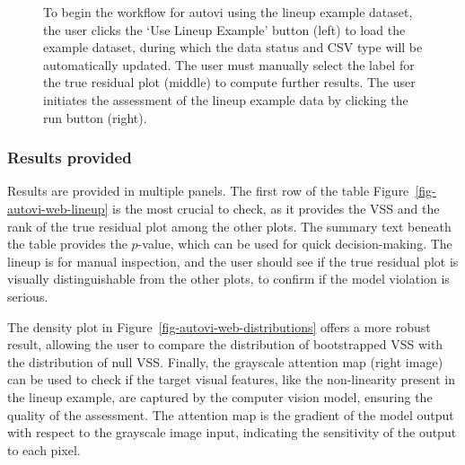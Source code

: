 \documentclass[
doublespace,
  times]{anzsauth}
\begin{document}
\begin{figure}


\caption{\label{fig-autovi-web-setup}To begin the workflow for
\textsf{autovi} using the lineup example dataset, the user clicks the
`Use Lineup Example' button (left) to load the example dataset, during
which the data status and CSV type will be automatically updated. The
user must manually select the label for the true residual plot (middle)
to compute further results. The user initiates the assessment of the
lineup example data by clicking the run button (right).}

\end{figure}%

\subsubsection{Results provided}\label{results-provided}

Results are provided in multiple panels. The first row of the table
Figure~\ref{fig-autovi-web-lineup} is the most crucial to check, as it
provides the VSS and the rank of the true residual plot among the other
plots. The summary text beneath the table provides the \(p\)-value,
which can be used for quick decision-making. The lineup is for manual
inspection, and the user should see if the true residual plot is
visually distinguishable from the other plots, to confirm if the model
violation is serious.

The density plot in Figure~\ref{fig-autovi-web-distributions} offers a
more robust result, allowing the user to compare the distribution of
bootstrapped VSS with the distribution of null VSS. Finally, the
grayscale attention map (right image) can be used to check if the target
visual features, like the non-linearity present in the lineup example,
are captured by the computer vision model, ensuring the quality of the
assessment. The attention map is the gradient of the model output with
respect to the grayscale image input, indicating the sensitivity of the
output to each pixel.
\end{document}
